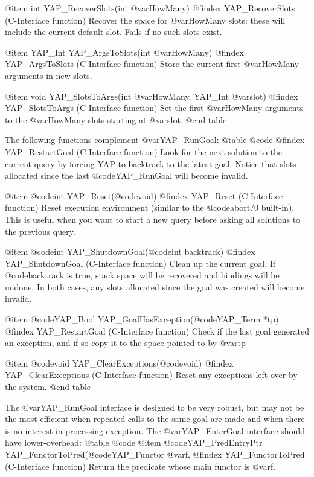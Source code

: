 {{{{{{{{{@item int YAP_RecoverSlots(int @var{HowMany})
@findex YAP_RecoverSlots (C-Interface function)
Recover the space for @var{HowMany} slots: these will include the
current default slot. Fails if no such slots exist.

@item YAP_Int YAP_ArgsToSlots(int @var{HowMany})
@findex YAP_ArgsToSlots (C-Interface function)
Store the current first  @var{HowMany} arguments in new slots.

@item void YAP_SlotsToArgs(int @var{HowMany}, YAP_Int @var{slot})
@findex YAP_SlotsToArgs (C-Interface function)
Set the first @var{HowMany} arguments to the @var{HowMany} slots
starting at @var{slot}.
@end table

The following functions complement @var{YAP_RunGoal}:
@table @code
@findex YAP_RestartGoal (C-Interface function)
Look for the next solution to the current query by forcing YAP to
backtrack to the latest goal. Notice that slots allocated since the last
@code{YAP_RunGoal} will become invalid.

@item  @code{int} YAP_Reset(@code{void})
@findex YAP_Reset (C-Interface function)
Reset execution environment (similar to the @code{abort/0}
built-in). This is useful when you want to start a new query before
asking all solutions to the previous query.

@item  @code{int} YAP_ShutdownGoal(@code{int backtrack})
@findex YAP_ShutdownGoal (C-Interface function)
Clean up the current goal. If
@code{backtrack} is true, stack space will be recovered and bindings
will be undone. In both cases, any slots allocated since the goal was
created will become invalid.

@item  @code{YAP_Bool} YAP_GoalHasException(@code{YAP_Term *tp})
@findex YAP_RestartGoal (C-Interface function)
Check if the last goal generated an exception, and if so copy it to the
space pointed to by @var{tp}

@item  @code{void} YAP_ClearExceptions(@code{void})
@findex YAP_ClearExceptions (C-Interface function)
Reset any exceptions left over by the system.
@end table

The @var{YAP_RunGoal} interface is designed to be very robust, but may
not be the most efficient when repeated calls to the same goal are made
and when there is no interest in processing exception. The
@var{YAP_EnterGoal} interface should have lower-overhead:
@table @code
@item  @code{YAP_PredEntryPtr} YAP_FunctorToPred(@code{YAP_Functor} @var{f},
@findex YAP_FunctorToPred (C-Interface function)
Return the predicate whose main functor is @var{f}.

}}}}}}}}}
